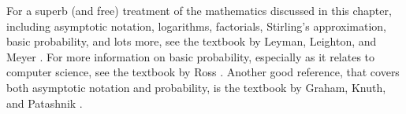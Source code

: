 For a superb (and free) treatment of the mathematics discussed in this
chapter, including asymptotic notation, logarithms, factorials, Stirling's
approximation, basic probability, and lots more, see the textbook
by Leyman, Leighton, and Meyer \cite{llm11}.  For more information on
basic probability, especially as it relates to computer science, see the
textbook by Ross \cite{r01}.  Another good reference, that covers both
asymptotic notation and probability, is the textbook by Graham, Knuth,
and Patashnik \cite{gkp94}.





